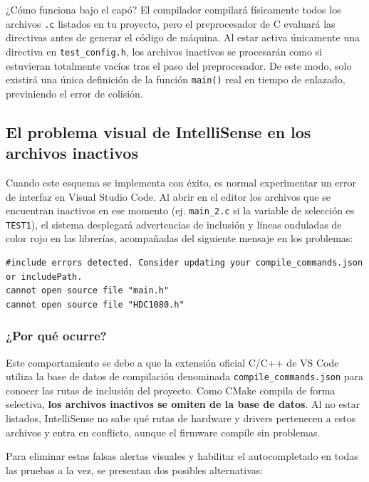 \documentclass[
10pt, %
a4paper, %
oneside, %
headinclude,footinclude, %
BCOR5mm, %
]{scrartcl}
\begin{document}
\begin{InfoBox}{¿Cómo funciona bajo el capó?}
	El compilador compilará físicamente todos los archivos \texttt{.c} listados en tu proyecto, pero el preprocesador de C evaluará las directivas antes de generar el código de máquina. Al estar activa únicamente una directiva en \texttt{test\_config.h}, los archivos inactivos se procesarán como si estuvieran totalmente vacíos tras el paso del preprocesador. De este modo, solo existirá una única definición de la función \texttt{main()} real en tiempo de enlazado, previniendo el error de colisión.
\end{InfoBox}

\subsection{El problema visual de IntelliSense en los archivos inactivos}
Cuando este esquema se implementa con éxito, es normal experimentar un error de interfaz en Visual Studio Code. Al abrir en el editor los archivos que se encuentran inactivos en ese momento (ej. \texttt{main\_2.c} si la variable de selección es \texttt{TEST1}), el sistema desplegará advertencias de inclusión y líneas onduladas de color rojo en las librerías, acompañadas del siguiente mensaje en los problemas:
\begin{lstlisting}[language=DOS]
#include errors detected. Consider updating your compile_commands.json or includePath.
cannot open source file "main.h"
cannot open source file "HDC1080.h"
\end{lstlisting}

\subsubsection{¿Por qué ocurre?}
Este comportamiento se debe a que la extensión oficial C/C++ de VS Code utiliza la base de datos de compilación denominada \texttt{compile\_commands.json} para conocer las rutas de inclusión del proyecto. Como CMake compila de forma selectiva, \textbf{los archivos inactivos se omiten de la base de datos}. Al no estar listados, IntelliSense no sabe qué rutas de hardware y drivers pertenecen a estos archivos y entra en conflicto, aunque el firmware compile sin problemas.

Para eliminar estas falsas alertas visuales y habilitar el autocompletado en todas las pruebas a la vez, se presentan dos posibles alternativas:
\end{document}
